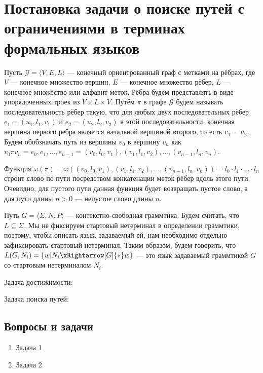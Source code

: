 \section{Постановка задачи о поиске путей с ограничениями в терминах формальных языков}

Пусть $\mathcal{G} = \langle V,E,L \rangle$ --- конечный ориентрованный граф с метками на рёбрах, где $V$ --- конечное множество вершин, $E$ --- конечное множество рёбер, $L$ --- конечное множество или алфавит меток.
Рёбра будем представлять в виде упорядоченных троек из $V \times L \times V$.
Путём $\pi$ в графе $\mathcal{G}$ будем называть последовательность рёбер такую, что для любых двух последовательных рёбер $e_1=(u_1,l_1,v_1)$ и $e_2=(u_2,l_2,v_2)$ в этой последовательности, конечная вершина первого ребра является начальной вершиной второго, то есть $v_1 = u_2$.
Будем обобзначать путь из вершины $v_0$ в вершину $v_n$ как $v_0 \pi v_n = e_0,e_1, \dots, e_{n-1} = (v_0, l_0, v_1),(v_1,l_1,v_2),\dots,(v_{n-1},l_n,v_n)$.

Функция $\omega(\pi) = \omega((v_0, l_0, v_1),(v_1,l_1,v_2),\dots,(v_{n-1},l_n,v_n)) = l_0 \cdot l_1 \cdot \ldots \cdot l_n $ строит слово по пути посредством конкатенации меток рёбер вдоль этого пути.
Очевидно, для пустого пути данная функция будет возвращать пустое слово, а для пути длины $n  > 0$ --- непустое слово длины $n$.

Путь $G = \langle \Sigma, N, P \rangle$ --- контекстно-свободная граммтика.
Будем считать, что $L \subseteq \Sigma$.
Мы не фиксируем стартовый нетерминал в определении граммтики, поэтому, чтобы описать язык, задаваемый ей, нам необходимо отдельно зафиксировать стартовый нетерминал.
Таким образом, будем говорить, что $L(G,N_i) = \{ w | N_i \xRightarrow[G]{*} w  \}$ --- это язык задаваемый граммтикой $G$ со стартовым нетерминалом $N_i$.

Задача достижимости:

Задача поиска путей:


\subsection{Вопросы и задачи}
\begin{enumerate}
  \item Задача 1
  \item Задача 2
\end{enumerate}
